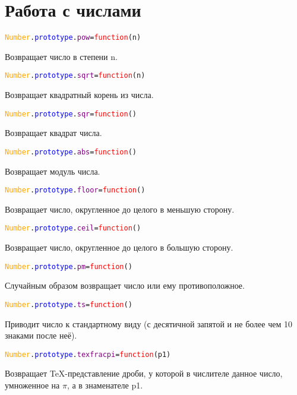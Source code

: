 	\section{Работа с числами}
		\begin{alltt}
			\textcolor{Orange}{Number}.\textcolor{Blue}{prototype}.\textcolor{Purple}{pow}=\textcolor{Red}{function}(n)
		\end{alltt}
	Возвращает число в степени n.
		\begin{alltt}
			\textcolor{Orange}{Number}.\textcolor{Blue}{prototype}.\textcolor{Purple}{sqrt}=\textcolor{Red}{function}(n)
		\end{alltt}
	Возвращает квадратный корень из числа.
		\begin{alltt}
			\textcolor{Orange}{Number}.\textcolor{Blue}{prototype}.\textcolor{Purple}{sqr}=\textcolor{Red}{function}()
		\end{alltt}
	Возвращает квадрат числа.
		\begin{alltt}
			\textcolor{Orange}{Number}.\textcolor{Blue}{prototype}.\textcolor{Purple}{abs}=\textcolor{Red}{function}()
		\end{alltt}
	Возвращает модуль числа.
		\begin{alltt}
			\textcolor{Orange}{Number}.\textcolor{Blue}{prototype}.\textcolor{Purple}{floor}=\textcolor{Red}{function}()
		\end{alltt}
	Возвращает число, округленное до целого в меньшую сторону.
		\begin{alltt}
			\textcolor{Orange}{Number}.\textcolor{Blue}{prototype}.\textcolor{Purple}{ceil}=\textcolor{Red}{function}()
		\end{alltt}
	Возвращает число, округленное до целого в большую сторону.
		\begin{alltt}
			\textcolor{Orange}{Number}.\textcolor{Blue}{prototype}.\textcolor{Purple}{pm}=\textcolor{Red}{function}()
		\end{alltt}
	Случайным образом возвращает число или ему противоположное.
		\begin{alltt}
			\textcolor{Orange}{Number}.\textcolor{Blue}{prototype}.\textcolor{Purple}{ts}=\textcolor{Red}{function}()
		\end{alltt}
	Приводит число к стандартному виду (с десятичной запятой и не более чем 10 знаками после неё).
		\begin{alltt}
			\textcolor{Orange}{Number}.\textcolor{Blue}{prototype}.\textcolor{Purple}{texfracpi}=\textcolor{Red}{function}(p1)
		\end{alltt}
	Возвращает TeX-представление дроби, у которой в числителе данное число, умноженное на $\pi$, а в знаменателе p1.
